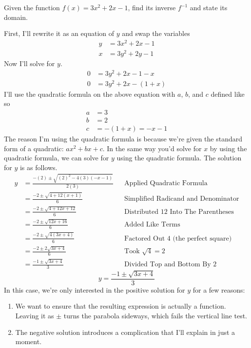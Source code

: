 Given the function $f(x) = 3x^2 + 2x - 1$, find its inverse $f^{-1}$ and state its domain.

First, I'll rewrite it as an equation of $y$ and swap the variables
\begin{align*}
    y &= 3x^2 + 2x - 1 \\
    x &= 3y^2 + 2y - 1
\end{align*}
Now I'll solve for $y$.
\begin{align*}
    0 &= 3y^2 + 2x - 1 - x \\
    0 &= 3y^2 + 2x - (1 + x)
\end{align*}
I'll use the quadratic formula on the above equation with $a$, $b$, and $c$ defined like so
\[
\begin{aligned}
    a &= 3 \\
    b &= 2 \\
    c &= -(1 + x) = -x - 1
\end{aligned}
\]
The reason I'm using the quadratic formula is because we're given the standard form of a quadratic: $ax^2 + bx + c$. In the same way you'd solve for $x$ by using the quadratic formula, we can solve for $y$ using the quadratic formula. The solution for $y$ is as follows.
\begin{align*}
y &= \frac{-(2) \pm \sqrt{(2)^2 - 4(3)(-x - 1)}}{2(3)} && \text{Applied Quadratic Formula}\\
&= \frac{-2 \pm \sqrt{4 + 12(x + 1)}}{6} && \text{Simplified Radicand and Denominator}\\
&= \frac{-2 \pm \sqrt{4 + 12x + 12}}{6} && \text{Distributed $12$ Into The Parentheses}\\
&= \frac{-2 \pm \sqrt{12x + 16}}{6} && \text{Added Like Terms}\\
&= \frac{-2 \pm \sqrt{4(3x + 4)}}{6} && \text{Factored Out $4$ (the perfect square)}\\
&= \frac{-2 \pm 2\sqrt{3x + 4}}{6} && \text{Took $\sqrt{4} = 2$}\\
&= \frac{-1 \pm \sqrt{3x + 4}}{3} && \text{Divided Top and Bottom By $2$}
\end{align*}
\[
y = \frac{-1 \pm \sqrt{3x + 4}}{3} 
\]
In this case, we're only interested in the positive solution for $y$ for a few reasons:
\begin{enumerate}
    \item We want to ensure that the resulting expression is actually a function. Leaving it as $\pm$ turns the parabola sideways, which fails the vertical line test.
    \item The negative solution introduces a complication that I'll explain in just a moment.
\end{enumerate}
